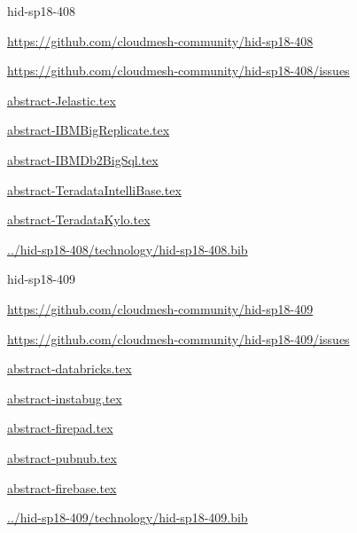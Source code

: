 \begin{IU}

hid-sp18-408

\url{https://github.com/cloudmesh-community/hid-sp18-408}

\url{https://github.com/cloudmesh-community/hid-sp18-408/issues}

\href{https://github.com/cloudmesh-community/hid-sp18-408/blob/master//technology/abstract-Jelastic.tex}{abstract-Jelastic.tex}

\href{https://github.com/cloudmesh-community/hid-sp18-408/blob/master//technology/abstract-IBMBigReplicate.tex}{abstract-IBMBigReplicate.tex}

\href{https://github.com/cloudmesh-community/hid-sp18-408/blob/master//technology/abstract-IBMDb2BigSql.tex}{abstract-IBMDb2BigSql.tex}

\href{https://github.com/cloudmesh-community/hid-sp18-408/blob/master//technology/abstract-TeradataIntelliBase.tex}{abstract-TeradataIntelliBase.tex}

\href{https://github.com/cloudmesh-community/hid-sp18-408/blob/master//technology/abstract-TeradataKylo.tex}{abstract-TeradataKylo.tex}

\href{https://github.com/cloudmesh-community/hid-sp18-408/blob/master//technology/hid-sp18-408.bib}{../hid-sp18-408/technology/hid-sp18-408.bib}

\end{IU}


\begin{IU}

hid-sp18-409

\url{https://github.com/cloudmesh-community/hid-sp18-409}

\url{https://github.com/cloudmesh-community/hid-sp18-409/issues}

\href{https://github.com/cloudmesh-community/hid-sp18-409/blob/master//technology/abstract-databricks.tex}{abstract-databricks.tex}

\href{https://github.com/cloudmesh-community/hid-sp18-409/blob/master//technology/abstract-instabug.tex}{abstract-instabug.tex}

\href{https://github.com/cloudmesh-community/hid-sp18-409/blob/master//technology/abstract-firepad.tex}{abstract-firepad.tex}

\href{https://github.com/cloudmesh-community/hid-sp18-409/blob/master//technology/abstract-pubnub.tex}{abstract-pubnub.tex}

\href{https://github.com/cloudmesh-community/hid-sp18-409/blob/master//technology/abstract-firebase.tex}{abstract-firebase.tex}

\href{https://github.com/cloudmesh-community/hid-sp18-409/blob/master//technology/hid-sp18-409.bib}{../hid-sp18-409/technology/hid-sp18-409.bib}

\end{IU}


